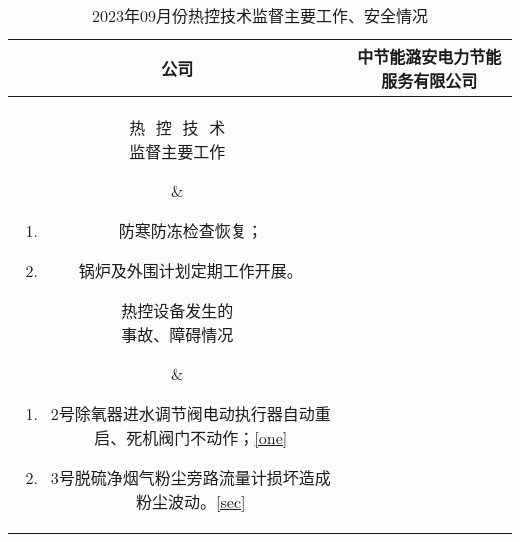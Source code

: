 \begin{table}[htbp]
	\centering
	\caption{2023年09月份热控技术监督主要工作、安全情况}
\begin{tabular}{|c|c|}
\hline
	公司 & 中节能潞安电力节能服务有限公司\tabularnewline
\hline
	\parbox[c][70ex][c]{6em}{热\,\,\,\,控\,\,\,\,技\,\,\,\,术\\监督主要工作}&
\begin{minipage}[c][70ex][c]{35em}
			\begin{enumerate}
				\item 防寒防冻检查恢复；
				\item 锅炉及外围计划定期工作开展。
			\end{enumerate}
		\end{minipage}
	\tabularnewline  
\hline
	\parbox[c][60ex][c]{7em}{热控设备发生的\\事故、障碍情况}&
		\begin{minipage}[c][60ex][c]{35em}
			\begin{enumerate}
				\item 2号除氧器进水调节阀电动执行器自动重启、死机阀门不动作；\ref{one}
				\item 3号脱硫净烟气粉尘旁路流量计损坏造成粉尘波动。\ref{sec}
			\end{enumerate}
		\end{minipage}
	\tabularnewline  
\hline
	\tabularnewline
\hline
\end{tabular}
\end{table}